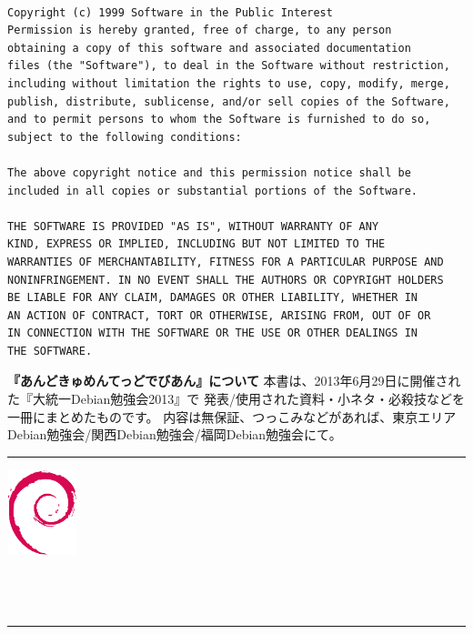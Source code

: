 \documentclass[mingoth,a4paper,twoside]{jsarticle}
\begin{document}
\begin{multicols}{2}
 \begin{fontsize}{6}{6}
 \begin{verbatim}

Copyright (c) 1999 Software in the Public Interest
Permission is hereby granted, free of charge, to any person
obtaining a copy of this software and associated documentation
files (the "Software"), to deal in the Software without restriction,
including without limitation the rights to use, copy, modify, merge,
publish, distribute, sublicense, and/or sell copies of the Software,
and to permit persons to whom the Software is furnished to do so,
subject to the following conditions:

The above copyright notice and this permission notice shall be
included in all copies or substantial portions of the Software.

THE SOFTWARE IS PROVIDED "AS IS", WITHOUT WARRANTY OF ANY
KIND, EXPRESS OR IMPLIED, INCLUDING BUT NOT LIMITED TO THE
WARRANTIES OF MERCHANTABILITY, FITNESS FOR A PARTICULAR PURPOSE AND
NONINFRINGEMENT. IN NO EVENT SHALL THE AUTHORS OR COPYRIGHT HOLDERS
BE LIABLE FOR ANY CLAIM, DAMAGES OR OTHER LIABILITY, WHETHER IN
AN ACTION OF CONTRACT, TORT OR OTHERWISE, ARISING FROM, OUT OF OR
IN CONNECTION WITH THE SOFTWARE OR THE USE OR OTHER DEALINGS IN
THE SOFTWARE.
 \end{verbatim}
 \end{fontsize}
\end{multicols}

\newpage
\thispagestyle{empty}\mbox{}
\newpage

\thispagestyle{empty}
{
\large
\begin{itembox}{\bf{『あんどきゅめんてっどでびあん』について}}
  本書は、2013年6月29日に開催された『大統一Debian勉強会2013』で
  発表/使用された資料・小ネタ・必殺技などを一冊にまとめたものです。
  内容は無保証、つっこみなどがあれば、東京エリアDebian勉強会/関西Debian勉強会/福岡Debian勉強会にて。
\end{itembox}
}

\vfill

{\color{dancerlightblue}\rule{\hsize}{1mm}}
\vspace{2mm}
\includegraphics[width=2cm]{image2013-gum/openlogo-nd.eps}
\\
 \\
 \\
\\
{\color{dancerdarkblue}\rule{\hsize}{1mm}}
\end{document}
